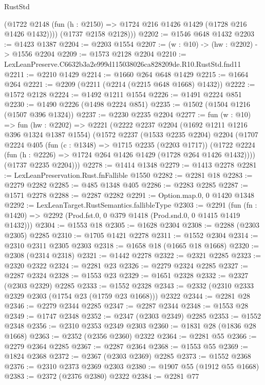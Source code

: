 \begin{lexlean}{RustStd}
\begin{coremodule}
          (@1722 @2148 (fun (h : @2150) => @1724 @216 @1426 @1429 (@1728 @216 @1426 @1432))))
        (@1737 @2158 @2128)))
@2202 := @1546 @648 @1432
@2203 := @1423 @1387
@2204 := @2203 @1554
@2207 := (w : @10) -> (hw : @2202) -> @1556 @2204
@2209 := @1573 @2128 @2204
@2210 := LexLeanPreserve.C6632b3a2e999d115038026ca828209de.R10.RustStd.fnd11
@2211 := @2210 @1429
@2214 := @1660 @264 @648 @1429
@2215 := @1664 @264
@2221 := @2209 (@2211 (@2214 (@2215 @648 @1668) @1432))
@2222 := @1572 @2128
@2224 := @1492 @1211 @1554
@2226 := @1491 @2224 @851
@2230 := @1490 @2226 (@1498 @2224 @851)
@2235 := @1502 (@1504 @1216 (@1507 @396 @1324))
@2237 := @2230 @2235 @2204
@2277 := fun (w : @10) =>
  fun (hw : @2202) =>
  @2221
    (@2222
      @2237
      @2204
      (@1692 @1211 @1216 @396 @1324 @1387 @1554)
      (@1572
        @2237
        (@1533 @2235 @2204)
        @2204
        (@1707
          @2224
          @405
          (fun (c : @1348) => @1715 @2235 (@2203 @1717))
          (@1722 @2224 (fun (h : @2226) => @1724 @264 @1426 @1429 (@1728 @264 @1426 @1432))))
        (@1737 @2235 @2204)))
@2278 := @1414 @1348
@2279 := @1413 @2278
@2281 := LexLeanPreservation.Rust.fnFallible @1550
@2282 := @2281 @18
@2283 := @2279 @2282
@2285 := @485 @1348 @405
@2286 := @2283 @2285
@2287 := @1571 @2278
@2288 := @2287 @2282
@2291 := Option.map.{0, 0} @1420 @1348
@2292 := LexLeanTarget.RustSemantics.fallibleType
@2303 := @2291
    (fun (fn : @1420) => @2292 (Prod.fst.{0, 0} @379 @1418 (Prod.snd.{0, 0} @1415 @1419 @1432)))
@2304 := @1553 @18
@2305 := @1628 @2304
@2308 := @2288 (@2303 @2305) @2285
@2310 := @1705 @1421 @2278
@2311 := @1552 @2304
@2314 := @2310 @2311 @2305 @2303
@2318 := @1658 @18 (@1665 @18 @1668)
@2320 := @2308 (@2314 @2318)
@2321 := @1442 @2278
@2322 := @2321 @2285
@2323 := @2320 @2322
@2324 := @2281 @23
@2326 := @2279 @2324 @2285
@2327 := @2287 @2324
@2328 := @1553 @23
@2329 := @1651 @2328
@2332 := @2327 (@2303 @2329) @2285
@2333 := @1552 @2328
@2343 := @2332 (@2310 @2333 @2329 @2303 (@1754 @23 (@1759 @23 @1668))) @2322
@2344 := @2281 @28
@2346 := @2279 @2344 @2285
@2347 := @2287 @2344
@2348 := @1553 @28
@2349 := @1747 @2348
@2352 := @2347 (@2303 @2349) @2285
@2353 := @1552 @2348
@2356 := @2310 @2353 @2349 @2303
@2360 := @1831 @28 (@1836 @28 @1668)
@2363 := @2352 (@2356 @2360) @2322
@2364 := @2281 @55
@2366 := @2279 @2364 @2285
@2367 := @2287 @2364
@2368 := @1553 @55
@2369 := @1824 @2368
@2372 := @2367 (@2303 @2369) @2285
@2373 := @1552 @2368
@2376 := @2310 @2373 @2369 @2303
@2380 := @1907 @55 (@1912 @55 @1668)
@2383 := @2372 (@2376 @2380) @2322
@2384 := @2281 @77

\end{coremodule}
\end{lexlean}
